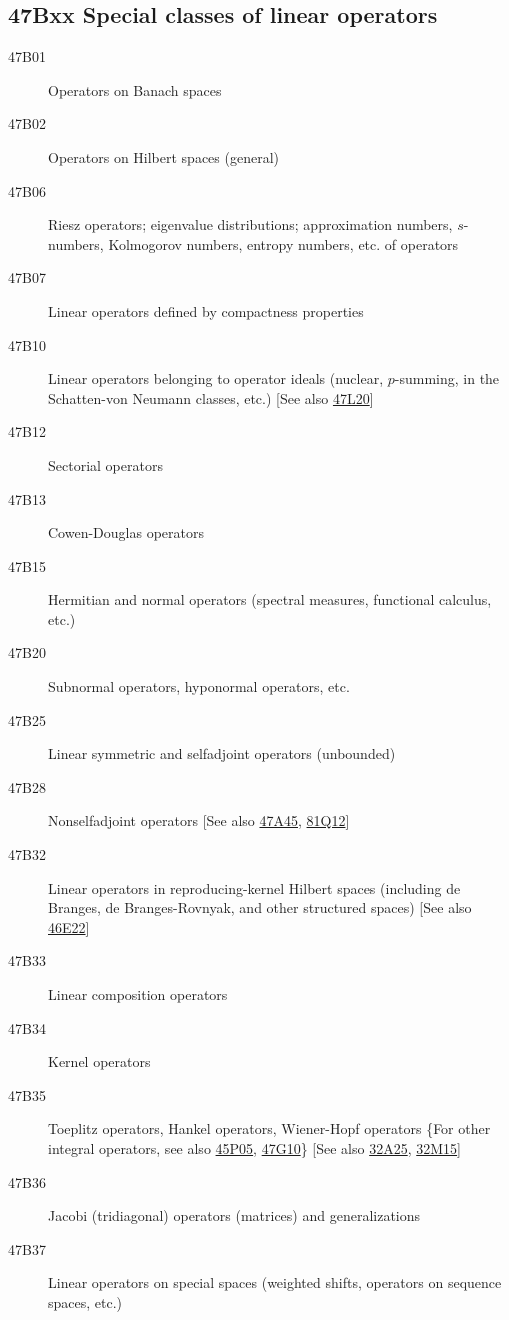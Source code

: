 \subsection*{47Bxx  Special classes of linear operators }\label{47Bxx}
\begin{description}  
\item [47B01]\label{47B01} Operators on Banach spaces
\item [47B02]\label{47B02} Operators on Hilbert spaces (general)
\item [47B06]\label{47B06} Riesz operators; eigenvalue distributions; approximation numbers, $s$-numbers, Kolmogorov numbers, entropy numbers, etc. of operators
\item [47B07]\label{47B07} Linear operators defined by compactness properties
\item [47B10]\label{47B10} Linear operators belonging to operator ideals (nuclear, $p$-summing, in the Schatten-von Neumann classes, etc.) [See also \hyperref[47L20]{47L20}]
\item [47B12]\label{47B12} Sectorial operators
\item [47B13]\label{47B13} Cowen-Douglas operators
\item [47B15]\label{47B15} Hermitian and normal operators (spectral measures, functional calculus, etc.)
\item [47B20]\label{47B20} Subnormal operators, hyponormal operators, etc.
\item [47B25]\label{47B25} Linear symmetric and selfadjoint operators (unbounded)
\item [47B28]\label{47B28} Nonselfadjoint operators [See also \hyperref[47A45]{47A45}, \hyperref[81Q12]{81Q12}]
\item [47B32]\label{47B32} Linear operators in reproducing-kernel Hilbert spaces (including de Branges, de Branges-Rovnyak, and other structured spaces) [See also \hyperref[46E22]{46E22}]
\item [47B33]\label{47B33} Linear composition operators
\item [47B34]\label{47B34} Kernel operators
\item [47B35]\label{47B35} Toeplitz operators, Hankel operators, Wiener-Hopf operators \{For other integral operators, see also \hyperref[45P05]{45P05}, \hyperref[47G10]{47G10}\} [See also \hyperref[32A25]{32A25}, \hyperref[32M15]{32M15}]
\item [47B36]\label{47B36} Jacobi (tridiagonal) operators (matrices) and generalizations
\item [47B37]\label{47B37} Linear operators on special spaces (weighted shifts, operators on sequence spaces, etc.)

\end{description}
